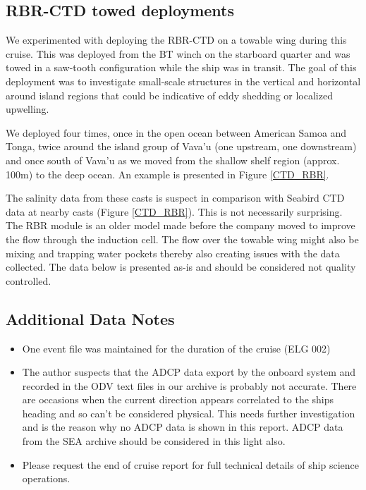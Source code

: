 \documentclass[letterpaper,11pt]{article}
\begin{document}
\subsection*{RBR-CTD towed deployments}

We experimented with deploying the RBR-CTD on a towable wing during this cruise. This was deployed from the BT winch on the starboard quarter and was towed in a saw-tooth configuration while the ship was in transit. The goal of this deployment was to investigate small-scale structures in the vertical and horizontal around island regions that could be indicative of eddy shedding or localized upwelling.

We deployed four times, once in the open ocean between American Samoa and Tonga, twice around the island group of Vava'u (one upstream, one downstream) and once south of Vava'u as we moved from the shallow shelf region (approx. 100m) to the deep ocean. An example is presented in Figure \ref{CTD_RBR}.

The salinity data from these casts is suspect in comparison with Seabird CTD data at nearby casts (Figure \ref{CTD_RBR}). This is not necessarily surprising. The RBR module is an older model made before the company moved to improve the flow through the induction cell. The flow over the towable wing might also be mixing and trapping water pockets thereby also creating issues with the data collected. The data below is presented as-is and should be considered not quality controlled.

\subsection*{Additional Data Notes}

\begin{itemize}
 \item One event file was maintained for the duration of the cruise (ELG 002)
 \item The author suspects that the ADCP data export by the onboard system and recorded in the ODV text files in our archive is probably not accurate. There are occasions when the current direction appears correlated to the ships heading and so can't be considered physical. This needs further investigation and is the reason why no ADCP data is shown in this report. ADCP data from the SEA archive should be considered in this light also.
 \item Please request the end of cruise report for full technical details of ship science operations.
\end{itemize}
\end{document}
